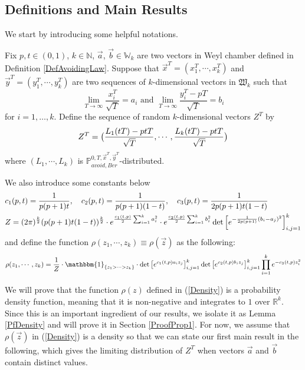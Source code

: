 \subsection{Definitions and Main Results}{\label{DefMainRes}}
We start by introducing some helpful notations.
\begin{definition}\label{DefScaled}
	Fix $p,t\in(0,1)$, $k\in\mathbb{N}$, $\vec{a}$, $\vec{b}\in \mathbb{W}_{k}$ are two vectors in Weyl chamber defined in Definition \ref{DefAvoidingLaw}. Suppose that $\vec{x}^{T}=(x_{1}^{T},\cdots,x_{k}^{T})$ and $\vec{y}^{T}=(y_{1}^{T},\cdots,y_{k}^{T})$ are two sequences of $k$-dimensional vectors in $\mathfrak{W}_{k}$ such that $$\lim_{T\rightarrow\infty}\frac{x_{i}^{T}}{\sqrt{T}}=a_{i} \text{ and } \lim_{T\rightarrow\infty}\frac{y_{i}^{T}-pT}{\sqrt{T}}=b_{i}$$ for $i=1,\dots,k$. Define the sequence of random $k$-dimensional vectors $Z^{T}$ by 
	\begin{align}{\label{ZTandL}}
		\begin{split}
		Z^{T}=\big(\frac{L_{1}(tT)-ptT}{\sqrt{T}},\cdots,\frac{L_{k}(tT)-ptT}{\sqrt{T}}\big)
	\end{split}
	\end{align}
	where $(L_{1},\cdots,L_{k})$ is $\mathbb{P}^{0,T,\vec{x}^{T},\vec{y}^{T}}_{avoid,Ber}$-distributed.
\end{definition}

We also introduce some constants below
\begin{align}{\label{WCconst}}
	\begin{split}
	&c_{1}(p,t)=\frac{1}{p(p+1)t}, \quad c_{2}(p,t)=\frac{1}{p(p+1)(1-t)}, \quad c_{3}(p,t)=\frac{1}{2p(p+1)t(1-t)}\\
	&Z=(2\pi)^{\frac{k}{2}}(p(p+1)t(1-t))^{\frac{k}{2}}\cdot e^{\frac{c_{1}(t,p)}{2}\sum_{i=1}^{k}a_{i}^{2}}\cdot e^{\frac{c_{2}(t,p)}{2}\sum_{i=1}^{k}b_{i}^{2}}\det\left[e^{-\frac{1}{2p(p+1)}(b_{i}-a_{j})^{2}}\right]_{i,j=1}^{k}
	\end{split}
\end{align}
and define the function $\rho(z_{1},\cdots, z_{k})\equiv\rho(\vec{z})$ as the following:
\begin{align}{\label{Density}}
	\rho(z_{1},\cdots,z_{k})=\frac{1}{Z}\cdot \mathbbm{1}_{\{z_{1}>\cdots >z_{k}\}}\cdot \det\big[e^{c_{1}(t,p)a_{i}z_{j}}\big]_{i,j=1}^{k}\det\big[e^{c_{2}(t,p)b_{i}z_{j}}\big]_{i,j=1}^{k}\prod_{i=1}^{k}e^{-c_{3}(t,p)z_{i}^{2}}
\end{align}

We will prove that the function $\rho(z)$ defined in (\ref{Density}) is a probability density function, meaning that it is non-negative and integrates to $1$ over $\mathbb{R}^{k}$. Since this is an important ingredient of our results, we isolate it as Lemma \ref{PfDensity} and will prove it in Section \ref{ProofProp1}. For now, we assume that $\rho(\vec{z})$ in (\ref{Density}) is a density so that we can state our first main result in the following, which gives the limiting distribution of $Z^{T}$ when vectors $\vec{a}$ and $\vec{b}$ contain distinct values.


